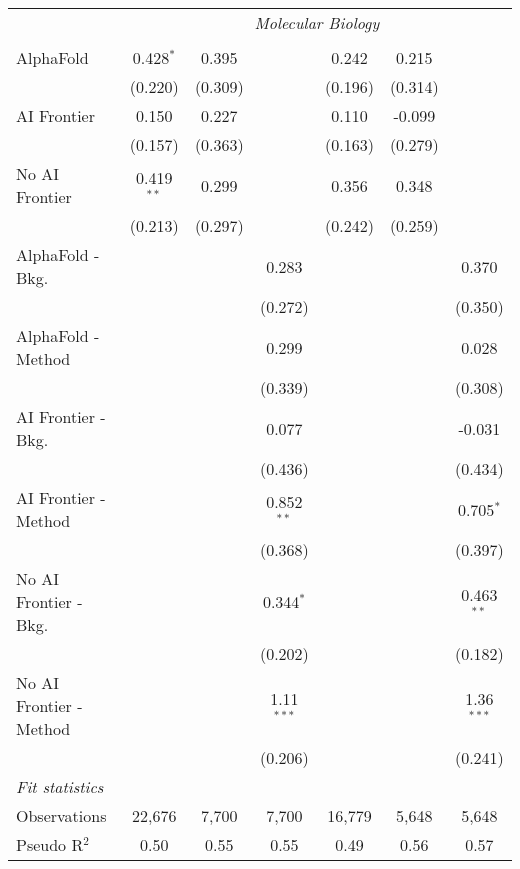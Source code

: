 \begin{tabular}{lcccccc}
 & \multicolumn{6}{c}{\textit{Molecular Biology}} \\ \\
   AlphaFold               & 0.428$^{*}$  & 0.395   &              & 0.242   & 0.215   &   \\   
                           & (0.220)      & (0.309) &              & (0.196) & (0.314) &   \\   
   AI Frontier             & 0.150        & 0.227   &              & 0.110   & -0.099  &   \\   
                           & (0.157)      & (0.363) &              & (0.163) & (0.279) &   \\   
   No AI Frontier          & 0.419$^{**}$ & 0.299   &              & 0.356   & 0.348   &   \\   
                           & (0.213)      & (0.297) &              & (0.242) & (0.259) &   \\   
   AlphaFold - Bkg.        &              &         & 0.283        &         &         & 0.370\\   
                           &              &         & (0.272)      &         &         & (0.350)\\   
   AlphaFold - Method      &              &         & 0.299        &         &         & 0.028\\   
                           &              &         & (0.339)      &         &         & (0.308)\\   
   AI Frontier - Bkg.      &              &         & 0.077        &         &         & -0.031\\   
                           &              &         & (0.436)      &         &         & (0.434)\\   
   AI Frontier - Method    &              &         & 0.852$^{**}$ &         &         & 0.705$^{*}$\\   
                           &              &         & (0.368)      &         &         & (0.397)\\   
   No AI Frontier - Bkg.   &              &         & 0.344$^{*}$  &         &         & 0.463$^{**}$\\   
                           &              &         & (0.202)      &         &         & (0.182)\\   
   No AI Frontier - Method &              &         & 1.11$^{***}$ &         &         & 1.36$^{***}$\\   
                           &              &         & (0.206)      &         &         & (0.241)\\   
   \midrule
   \emph{Fit statistics}\\
   Observations            & 22,676       & 7,700   & 7,700        & 16,779  & 5,648   & 5,648\\  
   Pseudo R$^2$            & 0.50         & 0.55    & 0.55         & 0.49    & 0.56    & 0.57\\  
   

\end{tabular}
